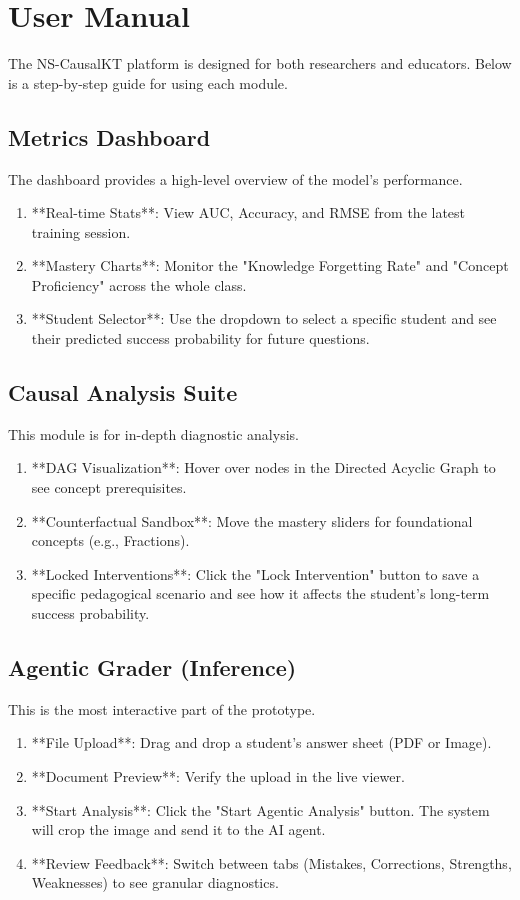 \section{User Manual}
The NS-CausalKT platform is designed for both researchers and educators. Below is a step-by-step guide for using each module.

\subsection{Metrics Dashboard}
The dashboard provides a high-level overview of the model's performance.
\begin{enumerate}
    \item **Real-time Stats**: View AUC, Accuracy, and RMSE from the latest training session.
    \item **Mastery Charts**: Monitor the "Knowledge Forgetting Rate" and "Concept Proficiency" across the whole class.
    \item **Student Selector**: Use the dropdown to select a specific student and see their predicted success probability for future questions.
\end{enumerate}

\subsection{Causal Analysis Suite}
This module is for in-depth diagnostic analysis.
\begin{enumerate}
    \item **DAG Visualization**: Hover over nodes in the Directed Acyclic Graph to see concept prerequisites.
    \item **Counterfactual Sandbox**: Move the mastery sliders for foundational concepts (e.g., Fractions).
    \item **Locked Interventions**: Click the "Lock Intervention" button to save a specific pedagogical scenario and see how it affects the student's long-term success probability.
\end{enumerate}

\subsection{Agentic Grader (Inference)}
This is the most interactive part of the prototype.
\begin{enumerate}
    \item **File Upload**: Drag and drop a student's answer sheet (PDF or Image).
    \item **Document Preview**: Verify the upload in the live viewer.
    \item **Start Analysis**: Click the "Start Agentic Analysis" button. The system will crop the image and send it to the AI agent.
    \item **Review Feedback**: Switch between tabs (Mistakes, Corrections, Strengths, Weaknesses) to see granular diagnostics.
\end{enumerate}

